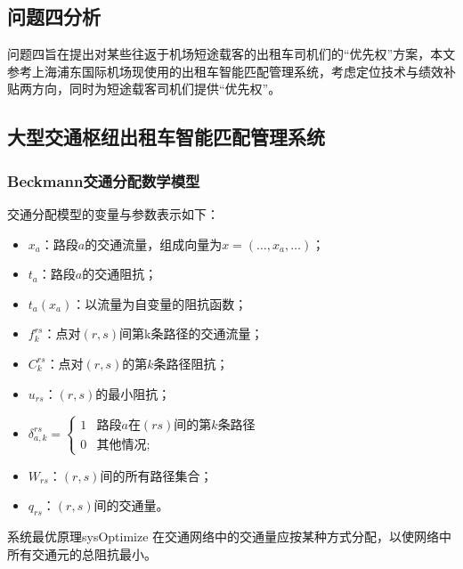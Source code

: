 \subsection{问题四分析}
问题四旨在提出对某些往返于机场短途载客的出租车司机们的``优先权''方案，本文参考上海浦东国际机场现使用的出租车智能匹配管理系统，考虑定位技术与绩效补贴两方向，同时为短途载客司机们提供``优先权''。

\subsection{大型交通枢纽出租车智能匹配管理系统}
\subsubsection{Beckmann交通分配数学模型}
交通分配模型的变量与参数表示如下：
\begin{itemize}
    \item $x_a$：路段$a$的交通流量，组成向量为$x = (\dots,x_a,\dots)$；
    
    \item $t_a$：路段$a$的交通阻抗；
    
    \item $t_a(x_a)$：以流量为自变量的阻抗函数；
    
    \item $f_k^{rs}$：点对$(r,s)$间第k条路径的交通流量；
    
    \item $C_k^{rs}$：点对$(r,s)$的第$k$条路径阻抗；
    
    \item $u_{rs}$：$(r,s)$的最小阻抗；
    
    \item $\delta_{a,k}^{rs} = \begin{cases}
            1 & \text{路段$a$在$(rs)$间的第$k$条路径}\\
            0 & \text{其他情况};
        \end{cases}$
    
    \item $W_{rs}$：$(r,s)$间的所有路径集合；
    
    \item $q_{rs}$：$(r,s)$间的交通量。
\end{itemize}

\begin{theobox}{系统最优原理}{sysOptimize}
    在交通网络中的交通量应按某种方式分配，以使网络中所有交通元的总阻抗最小。
\end{theobox}

